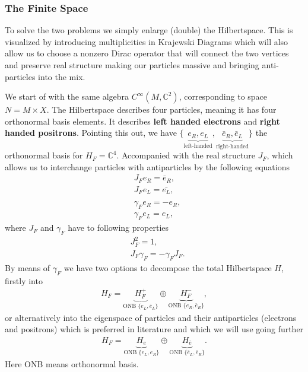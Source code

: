 \subsubsection{The Finite Space}
To solve the two problems we simply enlarge (double) the Hilbertspace. This
is visualized by introducing multiplicities in Krajewski Diagrams which will also
allow us to choose a nonzero Dirac operator that will connect the two
vertices and preserve real structure making our particles massive and
bringing anti-particles into the mix.

We start of with the same algebra $C^\infty(M, \mathbb{C}^2)$, corresponding
to space $N= M\times X$. The Hilbertspace describes four particles, meaning
it has four orthonormal basis elements. It describes \textbf{left handed
electrons} and \textbf{right handed positrons}. Pointing this out, we have
$\{ \underbrace{e_R, e_L}_{\text{left-handed}}, \underbrace{\bar{e}_R,
\bar{e}_L}_{\text{right-handed}}\}$ the orthonormal basis for $H_F =
\mathbb{C}^4$. Accompanied with the real structure $J_F$, which allows us to
interchange particles with antiparticles by the following equations
\begin{align}
    &J_F e_R = \bar{e}_R, \\
    &J_F e_L = \bar{e_L}, \\
    \nonumber \\
    &\gamma _F e_R = -e_R,\\
    &\gamma_F e_L = e_L,
\end{align}
where $J_F$ and $\gamma_F$ have to following properties
\begin{align}
    &J_F^2 = 1,\\
    & J_F \gamma_F  = - \gamma_F J_F.
\end{align}
By means of $\gamma_F$ we have two options to decompose the total
Hilbertspace $H$, firstly into
\begin{align}
    H_F = \underbrace{H_F^+}_{\text{ONB } \{e_L, \bar{e}_L\}}
    \oplus \underbrace{H_F^-}_{\text{ONB } \{e_R, \bar{e}_R\}},
\end{align}
or alternatively into the eigenspace of particles and their
antiparticles (electrons and positrons) which is preferred in literature and
which we will use going further
\begin{align}
    H_F = \underbrace{H_{e}}_{\text{ONB } \{e_L, e_R\}} \oplus
    \underbrace{H_{\bar{e}}}_{\text{ONB } \{\bar{e}_L, \bar{e}_R\}}.
\end{align}
Here ONB means orthonormal basis.

